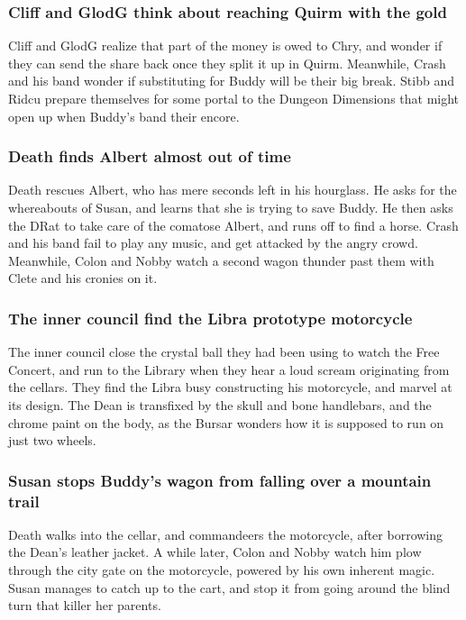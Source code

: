 \subsubsection{\Gls{Cliff} and \Gls{GlodG} think about reaching Quirm with the gold}
\Gls{Cliff} and \Gls{GlodG} realize that part of the money is owed to \Gls{Chry}, and wonder if
they can send the share back once they split it up in Quirm. Meanwhile, \Gls{Crash} and his band
wonder if substituting for \Gls{Buddy} will be their big break. \Gls{Stibb} and \Gls{Ridcu} prepare
themselves for some portal to the Dungeon Dimensions that might open up when \Gls{Buddy}'s band
their encore.

\subsubsection{\Gls{Death} finds \Gls{Albert} almost out of time}
\Gls{Death} rescues \Gls{Albert}, who has mere seconds left in his hourglass. He asks for the
whereabouts of \Gls{Susan}, and learns that she is trying to save \Gls{Buddy}. He then asks the
\Gls{DRat} to take care of the comatose \Gls{Albert}, and runs off to find a horse. \Gls{Crash} and
his band fail to play any music, and get attacked by the angry crowd. Meanwhile, \Gls{Colon} and
\Gls{Nobby} watch a second wagon thunder past them with \Gls{Clete} and his cronies on it.

\subsubsection{The inner council find the \Gls{Libra} prototype motorcycle}
The inner council close the crystal ball they had been using to watch the Free Concert, and run to
the Library when they hear a loud scream originating from the cellars. They find the \Gls{Libra}
busy constructing his motorcycle, and marvel at its design. The \Gls{Dean} is transfixed by the
skull and bone handlebars, and the chrome paint on the body, as the \Gls{Bursar} wonders how it is
supposed to run on just two wheels.

\subsubsection{\Gls{Susan} stops \Gls{Buddy}'s wagon from falling over a mountain trail}
\Gls{Death} walks into the cellar, and commandeers the motorcycle, after borrowing the \Gls{Dean}'s
leather jacket. A while later, \Gls{Colon} and \Gls{Nobby} watch him plow through the city gate on
the motorcycle, powered by his own inherent magic. \Gls{Susan} manages to catch up to the cart, and
stop it from going around the blind turn that killer her parents.

